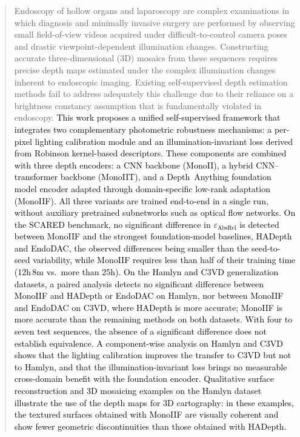 \documentclass[a4paper,fleqn]{cas-dc}
\begin{document}
\maketitle
\begin{abstract}
%
Endoscopy of hollow organs and laparoscopy are complex examinations 
in which diagnosis and minimally invasive surgery are performed by observing small field-of-view videos acquired under difficult-to-control camera poses and drastic viewpoint-dependent illumination changes.  Constructing accurate three-dimensional (3D) mosaics from these sequences requires precise depth maps estimated under the complex illumination changes inherent to endoscopic imaging.  Existing self-supervised depth estimation methods fail to address adequately this challenge due to their reliance on a brightness constancy assumption that is fundamentally violated in endoscopy. \textcolor{black}{This work proposes a unified self-supervised framework that integrates two complementary photometric robustness mechanisms: a per-pixel lighting calibration module and an illumination-invariant loss derived from Robinson kernel-based descriptors. These components are combined with three depth encoders: a CNN backbone (MonoII), a hybrid CNN--transformer backbone (MonoIIT), and a Depth~Anything foundation model encoder adapted through domain-specific low-rank adaptation (MonoIIF). All three variants are trained end-to-end in a single run, without auxiliary pretrained subnetworks such as optical flow networks. On the SCARED benchmark, \textcolor{black}{no significant difference in $\varepsilon_\textrm{AbsRel}$ is detected between MonoIIF and} the strongest foundation-model baselines, HADepth and EndoDAC, \textcolor{black}{the observed differences being} smaller than the seed-to-seed variability, \textcolor{black}{while MonoIIF requires} less than half of their training time (12h\,8m vs.\ more than 25h). On the Hamlyn and C3VD generalization datasets, \textcolor{black}{a paired analysis detects no significant difference between MonoIIF and HADepth or EndoDAC on Hamlyn, nor between MonoIIF and EndoDAC on C3VD, where HADepth is more accurate; MonoIIF is more accurate than the remaining methods on both datasets. With four to seven test sequences, the absence of a significant difference does not establish equivalence.} \textcolor{black}{A component-wise analysis on Hamlyn and C3VD shows that the lighting calibration improves the transfer to C3VD but not to Hamlyn, and that the illumination-invariant loss brings no measurable cross-domain benefit with the foundation encoder.} \textcolor{black}{Qualitative surface reconstruction and 3D mosaicing examples on the Hamlyn dataset illustrate the use of the depth maps for 3D cartography: in these examples, the textured surfaces obtained with MonoIIF are visually coherent and show fewer geometric discontinuities than those obtained with HADepth.}}
\end{abstract}
\end{document}
